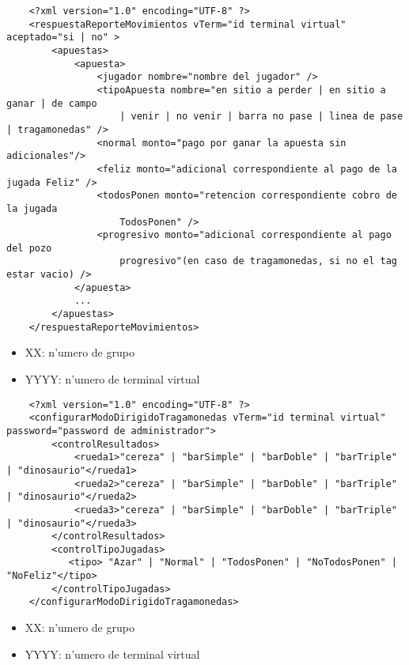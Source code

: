 \begin{verbatim}
    <?xml version="1.0" encoding="UTF-8" ?>
    <respuestaReporteMovimientos vTerm="id terminal virtual" aceptado="si | no" >
        <apuestas>
            <apuesta>
                <jugador nombre="nombre del jugador" />
                <tipoApuesta nombre="en sitio a perder | en sitio a ganar | de campo
                    | venir | no venir | barra no pase | linea de pase | tragamonedas" />
                <normal monto="pago por ganar la apuesta sin adicionales"/>
                <feliz monto="adicional correspondiente al pago de la jugada Feliz" />
                <todosPonen monto="retencion correspondiente cobro de la jugada
                    TodosPonen" />
                <progresivo monto="adicional correspondiente al pago del pozo
                    progresivo"(en caso de tragamonedas, si no el tag estar vacio) />
            </apuesta>
            ...
        </apuestas>
    </respuestaReporteMovimientos>
\end{verbatim}


 
\begin{itemize}
    \item{XX: n'umero de grupo}
    \item{YYYY: n'umero de terminal virtual}
\end{itemize}

\begin{verbatim}
    <?xml version="1.0" encoding="UTF-8" ?>
    <configurarModoDirigidoTragamonedas vTerm="id terminal virtual" password="password de administrador">
        <controlResultados>
            <rueda1>"cereza" | "barSimple" | "barDoble" | "barTriple" | "dinosaurio"</rueda1>
            <rueda2>"cereza" | "barSimple" | "barDoble" | "barTriple" | "dinosaurio"</rueda2>
            <rueda3>"cereza" | "barSimple" | "barDoble" | "barTriple" | "dinosaurio"</rueda3>
        </controlResultados>
        <controlTipoJugadas>
           <tipo> "Azar" | "Normal" | "TodosPonen" | "NoTodosPonen" | "NoFeliz"</tipo>
        </controlTipoJugadas>
    </configurarModoDirigidoTragamonedas>
\end{verbatim}


 
\begin{itemize}
    \item{XX: n'umero de grupo}
    \item{YYYY: n'umero de terminal virtual}
\end{itemize}

